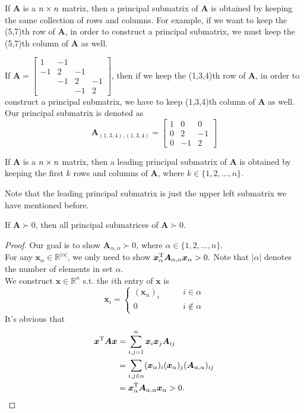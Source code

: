 \begin{definition}
If $\bm A$ is a $n\times n$ matrix, then a principal submatrix of $\bm A$ is obtained by keeping the same collection of rows and columns. For example, if we want to keep the (5,7)th row of $\bm A$, in order to construct a principal submatrix, we must keep the (5,7)th column of $\bm A$ as well.
\end{definition}
\begin{example}
If $\bm A=\begin{bmatrix}
1&-1&&\\-1&2&-1&\\&-1&2&-1\\&&-1&2
\end{bmatrix}$, then if we keep the (1,3,4)th row of $\bm A$, in order to construct a principal submatrix, we have to keep (1,3,4)th column of $\bm A$ as well. Our principal submatrix is denoted as
\[
\bm A_{(1,3,4),(1,3,4)}=\begin{bmatrix}
1&0&0\\0&2&-1\\0&-1&2
\end{bmatrix}
\]
\end{example}
\begin{definition}
If $\bm A$ is a $n\times n$ matrix, then a leading principal submatrix of $\bm A$ is obtained by keeping the first $k$ rows and columns of $\bm A$, where $k\in\{1,2,\dots,n\}.$
\end{definition}
Note that the leading principal submatrix is just the upper left submatrix we have mentioned before.
\begin{corollary}
If $\bm A\succ0$, then all principal submatrices of $\bm A\succ0.$
\end{corollary}
\begin{proof}
Our goal is to show $\bm A_{\alpha,\alpha}\succ0$, where $\alpha\in\{1,2,\dots,n\}$.\\
For any $\bm x_{\alpha}\in\mathbb{R}^{|\alpha|}$, we only need to show $\bm x_{\alpha}^{\mathrm T}\bm A_{\alpha,\alpha}\bm x_{\alpha}>0.$ Note that $|\alpha|$ denotes the number of elements in set $\alpha$.\\
We construct $\bm x\in\mathbb{R}^n$ s.t. the $i$th entry of $\bm x$ is
\[
\bm x_i=\left\{
\begin{aligned}
(\bm x_{\alpha})_i&\qquad i\in\alpha\\
0&\qquad i\notin\alpha
\end{aligned}\right.
\]
It's obvious that
\begin{align*}
\bm x^{\mathrm T}\bm A\bm x&=
\sum_{i,j=1}^{n}\bm x_i\bm x_j\bm A_{ij}\\
&=\sum_{i,j\in\alpha}(\bm x_{\alpha})_i(\bm x_{\alpha})_j(\bm A_{\alpha,\alpha})_{ij}\\
&=\bm x_{\alpha}^{\mathrm T}\bm A_{\alpha,\alpha}\bm x_{\alpha}>0.
\end{align*}
\end{proof}
